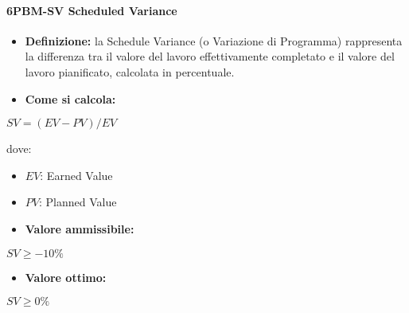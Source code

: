 \paragraph*{6PBM-SV Scheduled Variance}
\begin{itemize}
    \item \textbf{Definizione:} la Schedule Variance (o Variazione di Programma) rappresenta la differenza tra il valore del lavoro effettivamente completato e il valore del lavoro pianificato, calcolata in percentuale.
    \item \textbf{Come si calcola:}
\end{itemize}
\begin{center}
   $SV = (EV-PV)/EV$ 
\end{center}
dove:
\begin{itemize}[label=$\rightarrow$]
    \item $EV$: Earned Value
    \item $PV$: Planned Value
\end{itemize}
\begin{itemize}
    \item \textbf{Valore ammissibile:}
\end{itemize}
\begin{center}
    $SV \geq -10\%$
\end{center}
\begin{itemize}
    \item \textbf{Valore ottimo:}
\end{itemize}
\begin{center}
    $SV \geq 0\%$
\end{center}

